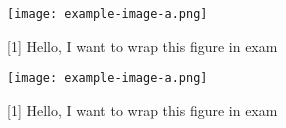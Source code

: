 \documentclass[12pt]{exam}
\begin{document}
\begin{questions}
  \question[5]\lipsum[2]
    {%
      \parbox[t]{.3\linewidth}
        {%
          \centering
          \texttt{[image: example-image-a.png]}%
        }%
    }[1]
    Hello, I want to wrap this figure in exam
    \lipsum[1]
    {%
      \parbox[t]{.3\linewidth}
        {%
          \centering
          \texttt{[image: example-image-a.png]}%
        }%
    }[1]
    Hello, I want to wrap this figure in exam
    \lipsum[1]
\end{questions}
\end{document}
